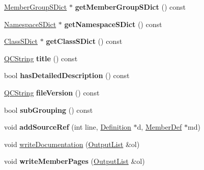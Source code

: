 \begin{DoxyCompactItemize}
\mbox{\hyperlink{class_member_group_s_dict}{Member\+Group\+S\+Dict}} $\ast$ {\bfseries get\+Member\+Group\+S\+Dict} () const
\item 
\mbox{\label{class_file_def_aec3333f1397838fec52f98a2ab2177aa}} 
\mbox{\hyperlink{class_namespace_s_dict}{Namespace\+S\+Dict}} $\ast$ {\bfseries get\+Namespace\+S\+Dict} () const
\item 
\mbox{\label{class_file_def_a3708792b23d548363ec5a2aabb479bb6}} 
\mbox{\hyperlink{class_class_s_dict}{Class\+S\+Dict}} $\ast$ {\bfseries get\+Class\+S\+Dict} () const
\item 
\mbox{\label{class_file_def_a60b522612acb295f22c56f01c4cf0942}} 
\mbox{\hyperlink{class_q_c_string}{Q\+C\+String}} {\bfseries title} () const
\item 
\mbox{\label{class_file_def_a6596436e4b4013c364d3787281fe42c2}} 
bool {\bfseries has\+Detailed\+Description} () const
\item 
\mbox{\label{class_file_def_a281b09954b560a9e47b9292aebc1519b}} 
\mbox{\hyperlink{class_q_c_string}{Q\+C\+String}} {\bfseries file\+Version} () const
\item 
\mbox{\label{class_file_def_aa451c6dc4347f344ba7153abadf2fe2a}} 
bool {\bfseries sub\+Grouping} () const
\item 
\mbox{\label{class_file_def_ab77cd017d7354f3bed14a639ac7cda39}} 
void {\bfseries add\+Source\+Ref} (int line, \mbox{\hyperlink{class_definition}{Definition}} $\ast$d, \mbox{\hyperlink{class_member_def}{Member\+Def}} $\ast$md)
\item 
void \mbox{\hyperlink{class_file_def_a7a73cf8448a6995be00369858d4768e8}{write\+Documentation}} (\mbox{\hyperlink{class_output_list}{Output\+List}} \&ol)
\item 
\mbox{\label{class_file_def_a8df204556e3773738f133314d8bc2fbb}} 
void {\bfseries write\+Member\+Pages} (\mbox{\hyperlink{class_output_list}{Output\+List}} \&ol)
\item 
\mbox{\label{class_file_def_a8fc73881eb3c7b5160dd851d9eeba1ef}} 

\end{DoxyCompactItemize}
